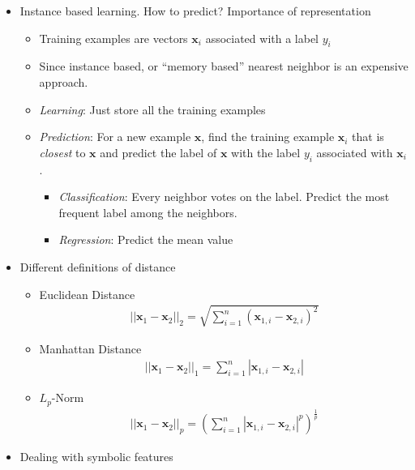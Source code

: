 \documentclass{article}
\begin{document}
\hspace{-1.5em}{\large \bf Nearest Neighbors}
\begin{itemize}
\item Instance based learning. How to predict? Importance of representation
	\begin{itemize}
	\item Training examples are vectors $\mathbf{x}_{i}$ associated with a label $y_{i}$
	\item Since instance based, or ``memory based'' nearest neighbor is an expensive approach. 
	\item {\em Learning}: Just store all the training examples
	\item {\em Prediction}: For a new example $\mathbf{x}$, find the training example $\mathbf{x}_{i}$ that is {\em closest} to $\mathbf{x}$ and predict the label of $\mathbf{x}$ with the label $y_{i}$ associated with $\mathbf{x}_{i}$.
	\begin{itemize}
		\item {\em Classification}: Every neighbor votes on the label. Predict the most frequent label among the neighbors.
		\item {\em Regression}: Predict the mean value
	\end{itemize}
	\end{itemize}
\item Different definitions of distance
	\begin{itemize}
	\item Euclidean Distance
	\begin{align*}
	\left|\left| \mathbf{x}_{1} - \mathbf{x}_{2}\right|\right|_{2} = \sqrt{\sum_{i=1}^{n}\left(\mathbf{x}_{1,i}-\mathbf{x}_{2,i}\right)^{2}}
	\end{align*}
	\item Manhattan Distance
	\begin{align*}
	\left|\left| \mathbf{x}_{1} - \mathbf{x}_{2}\right|\right|_{1} = \sum_{i=1}^{n}\left|\mathbf{x}_{1,i}-\mathbf{x}_{2,i}\right|
	\end{align*}
	\item $L_{p}$-Norm
	\begin{align*}
	\left|\left| \mathbf{x}_{1} - \mathbf{x}_{2}\right|\right|_{p} = \left( \sum_{i=1}^{n}\left|\mathbf{x}_{1,i}-\mathbf{x}_{2,i} \right|^{p} \right)^{\frac{1}{p}}
	\end{align*}
	\end{itemize}
\item Dealing with symbolic features
	\begin{itemize}

\end{itemize}
\end{itemize}
\end{document}
